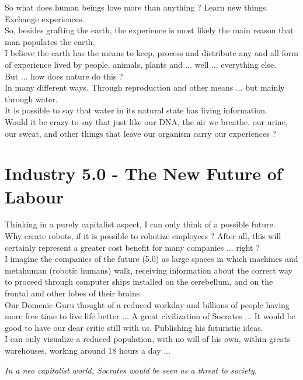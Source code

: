\documentclass[11pt]{book}
\begin{document}
\noindent So what does human beings love more than anything ? Learn new things. Exchange experiences. \\

\noindent So, besides grafting the earth, the experience is most likely the main reason that man populates the earth. \\

\noindent I believe the earth has the means to keep, process and distribute any and all form of experience lived by people, animals, plants and ... well ... everything else. \\

\noindent But ... how does nature do this ? \\

\noindent In many different ways. Through reproduction and other means ... but mainly through water. \\

\noindent It is possible to say that water in its natural state has living information. \\

\noindent Would it be crazy to say that just like our DNA, the air we breathe, our urine, our sweat, and other things that leave our organism carry our experiences ?

\chapter{Industry 5.0 - The New Future of Labour}

Thinking in a purely capitalist aspect, I can only think of a possible future. \\

Why create robots, if it is possible to robotize employees ? After all, this will certainly represent a greater cost benefit for many companies ... right ? \\

I imagine the companies of the future (5.0) as large spaces in which machines and metahuman (robotic humans) walk, receiving information about the correct way to proceed through computer ships installed on the cerebellum, and on the frontal and other lobes of their brains. \\

Our Domenic Guru thought of a reduced workday and billions of people having more free time to live life better ... A great civilization of Socrates ... It would be good to have our dear critic still with us. Publishing his futuristic ideas. \\

I can only visualize a reduced population, with no will of his own, within greats warehouses, working around 18 hours a day ...

\noindent \begin{center} \emph{In a neo capitalist world, Socrates would be seen as a threat to society.} \end{center}
\end{document}
